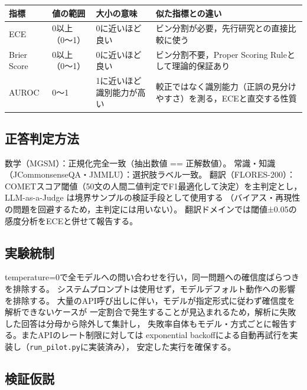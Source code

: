 \documentclass[11pt,a4paper,oneside]{article}
\begin{document}
\begin{center}
\begin{tabular}{p{}p{}p{}p{}}
\toprule
指標 & 値の範囲 & 大小の意味 & 似た指標との違い \\
\midrule
ECE & 0以上（0〜1） & 0に近いほど良い & ビン分割が必要，先行研究との直接比較に使う \\
Brier Score & 0以上（0〜1） & 0に近いほど良い & ビン分割不要，Proper Scoring Ruleとして理論的保証あり \\
AUROC & 0〜1 & 1に近いほど識別能力が高い & 較正ではなく識別能力（正誤の見分けやすさ）を測る，ECEと直交する性質 \\
\bottomrule
\end{tabular}
\end{center}

\subsection{正答判定方法}

数学（MGSM）：正規化完全一致（抽出数値 == 正解数値）。
常識・知識（JCommonsenseQA・JMMLU）：選択肢ラベル一致。
翻訳（FLORES-200）：COMETスコア閾値（50文の人間二値判定でF1最適化して決定）を主判定とし，
LLM-as-a-Judge \cite{zheng2023judging} は境界サンプルの検証手段として使用する
（バイアス・再現性の問題を回避するため，主判定には用いない）。
翻訳ドメインでは閾値±0.05の感度分析をECEと併せて報告する。

\subsection{実験統制}

temperature=0で全モデルへの問い合わせを行い，同一問題への確信度ばらつきを排除する。
システムプロンプトは使用せず，モデルデフォルト動作への影響を排除する。
大量のAPI呼び出しに伴い，モデルが指定形式に従わず確信度を解析できないケースが
一定割合で発生することが見込まれるため，解析に失敗した回答は分母から除外して集計し，
失敗率自体もモデル・方式ごとに報告する。またAPIのレート制限に対しては
exponential backoffによる自動再試行を実装し（\texttt{run\_pilot.py}に実装済み），
安定した実行を確保する。

\subsection{検証仮説}
\end{document}
